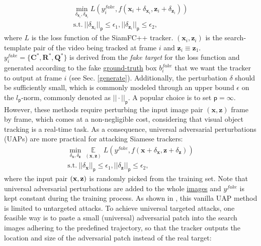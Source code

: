 \documentclass[journal]{IEEEtran}
\begin{document}
\begin{equation}
\begin{gathered}
  \min\limits_{\delta_{\textbf{x}_{i}}, \delta_{\textbf{z}_{i}}} L(y^{fake}_i, f(\textbf{x}_i + \delta_{\textbf{x}_{i}}, \textbf{z}_i + \delta_{\textbf{z}_{i}}))\\
  \text{s.t.}\ ||\delta_{\textbf{x}_i}||_{\mathsf{p}} \le \epsilon_1, ||\delta_{\textbf{z}_i}||_{\mathsf{p}} \le \epsilon_2,
\end{gathered}
\end{equation}
where $L$ is the loss function of the SiamFC++ tracker. $(\textbf{x}_i, \textbf{z}_i)$ is the search-template pair of the video being tracked at frame $i$ and $\textbf{z}_i \equiv \textbf{z}_1$. $y^{fake}_i=\{\textbf{C}^*, \textbf{R}^*, \textbf{Q}^*\}$ is derived from the \textit{fake target} for the loss function and generated according to the fake \uline{ground-truth} box $b^{fake}_i$ that we want the tracker to output at frame $i$ (see Sec. \ref{generate}). Additionally, the perturbation $\delta$ should be sufficiently small, which is commonly modeled through an upper bound $\epsilon$ on the $l_{\mathsf{p}}\text{-norm}$, commonly denoted as $||\cdot||_{\mathsf{p}}$. A popular choice is to set ${\mathsf{p}}=\infty$. However, these methods require perturbing the input image pair $(\textbf{x}, \textbf{z})$ frame by frame, which comes at a non-negligible cost, considering that visual object tracking is a real-time task. As a consequence, universal adversarial perturbations (UAPs) \cite{UAP, shafahi2020universal} are more practical for attacking Siamese trackers:
\begin{equation}
  \begin{gathered}
    \min\limits_{\delta_\textbf{x}, \delta_\textbf{z}} \mathop{\mathbb{E}}\limits_{(\textbf{x}, \textbf{z})} L(y^{fake}, f(\textbf{x} + \delta_\textbf{x}, \textbf{z} + \delta_\textbf{z}))\\
    \text{s.t.}\ ||\delta_\textbf{x}||_{\mathsf{p}} \le \epsilon_1, ||\delta_\textbf{z}||_{\mathsf{p}} \le \epsilon_2,
  \end{gathered}
  \label{eq:UAP}
\end{equation}  
where the input pair $(\textbf x,\textbf z)$ is randomly picked from the training set. Note that universal adversarial perturbations are added to the whole \uline{images} and $y^{fake}$ is kept constant during the training process. As shown in \cite{hirano2020simple}, this vanilla UAP method is limited to untargeted attacks. To achieve universal targeted attacks, one feasible way is to paste a small (universal) adversarial patch into the search images adhering to the predefined trajectory, so that the tracker outputs the location and size of the adversarial patch instead of the real target:
\end{document}

